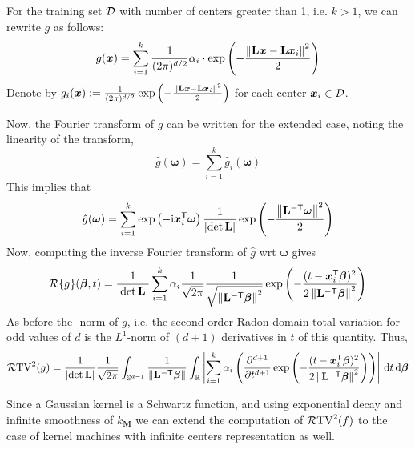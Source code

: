 For the training set ${\mathcal{D}}$ with number of centers greater than 1, i.e. $k > 1$, we can rewrite $g$ as follows:
\[
g(\bm{x}) = \sum_{i =1}^k \frac{1}{(2\pi)^{d/2}}  \alpha_i \cdot \exp \left( {-\frac{\left\|\mathbf{L}\bm{x} - \mathbf{L}\bm{x}_i\right\|^2}{2}} \right) 
\]
Denote by $g_i(\bm{x}) := \frac{1}{(2\pi)^{d/2}} \exp \left( {-\frac{\left\|\mathbf{L}\bm{x} - \mathbf{L}\bm{x}_i\right\|^2}{2}} \right) $ for each center $\bm{x}_i \in {\mathcal{D}}$.

Now, the Fourier transform of $g$ can be written for the extended case, noting the linearity of the transform,
\[
 \hat{g}(\bm{\omega}) = \sum_{i=1}^k \hat{g}_i(\bm{\omega})
\]
This implies that 
\[
 \hat{g}(\bm{\omega}) = \sum_{i =1}^k \exp \left( {-\mathrm{i}\bm{x}_i^\mathsf{T}\bm{\omega}} \right)  \frac{1}{\left|\det \mathbf{L}\right|} \exp \left( {-\frac{\left\|\mathbf{L}^{-\mathsf{T}} \bm{\omega}\right\|^2}{2}} \right) 
\]
Now, computing the inverse Fourier transform of $\hat{g}$ wrt $\bm{\omega}$ gives 
\[
\mathcal{R}\{g\}(\bm{\beta}, t) = \frac{1}{\left|\det \mathbf{L}\right|} \sum_{i=1}^k \alpha_i \frac{1}{\sqrt{2\pi}} \frac{1}{\sqrt{\left\|\mathbf{L}^{-\mathsf{T}}\bm{\beta}\right\|^2}} \exp \left( {-\frac{(t- \bm{x}_i^\mathsf{T}\bm{\beta})^2}{2\left\|\mathbf{L}^{-\mathsf{T}}\bm{\beta}\right\|^2}} \right) 
\]
As before the -norm of $g$, i.e. the second-order Radon domain total variation for odd values of $d$ is the $L^1$-norm of $(d+1)$ derivatives in $t$ of this quantity. Thus,
\[
\mathcal{R}\mathrm{TV}^2(g) = \frac{1}{\left|\det \mathbf{L}\right|} \frac{1}{\sqrt{2\pi}} \int_{\mathbb{S}^{d-1}} \frac{1}{{\left\|\mathbf{L}^{-\mathsf{T}}\bm{\beta}\right\|}} 
    \int_\mathbb{R}
    \left|\sum_{i=1}^k \alpha_i  \left( {\frac{\partial^{d+1}}{\partial t^{d+1}} \exp \left( {-\frac{(t-\bm{x}_i^\mathsf{T}\bm{\beta})^2}{2\left\|\mathbf{L}^{-\mathsf{T}}\bm{\beta}\right\|^2}} \right) } \right) \right| \,\mathrm{d}t\,\mathrm{d}\bm{\beta}
\]

Since a Gaussian kernel is a Schwartz function, and using exponential decay and infinite smoothness of $k_{\textbf{M}}$ we can extend the computation of $\mathcal{R}\mathrm{TV}^2({f})$ to the case of kernel machines with infinite centers representation as well.